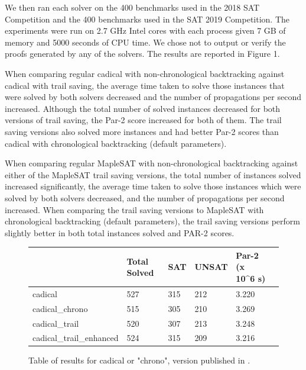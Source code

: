 \documentclass{article}
\begin{document}
We then ran each solver on the 400 benchmarks used in the 2018 SAT Competition and the 400 benchmarks used in the SAT 2019 Competition. The experiments were run on 2.7 GHz Intel cores with each process given 7 GB of memory and 5000 seconds of CPU time. We chose not to output or verify the proofs generated by any of the solvers. The results are reported in Figure 1.

When comparing regular cadical with non-chronological backtracking against cadical with trail saving, the average time taken to solve those instances that were solved by both solvers decreased and the number of propagations per second increased. Although the total number of solved instances decreased for both versions of trail saving, the Par-2 score increased for both of them. The trail saving versions also solved more instances and had better Par-2 scores than cadical with chronological backtracking (default parameters).

When comparing regular MapleSAT with non-chronological backtracking against either of the MapleSAT trail saving versions, the total number of instances solved increased significantly, the average time taken to solve those instances which were solved by both solvers decreased, and the number of propagations per second increased. When comparing the trail saving versions to MapleSAT with chronological backtracking (default parameters), the trail saving versions perform slightly better in both total instances solved and PAR-2 scores.

\begin{figure}
\begin{tabular}{|l|l|l|l|l|l|}
\hline
                         & Total Solved & SAT & UNSAT & Par-2 (x 10\textasciicircum{}6 s) \\ \hline
cadical                  & 527          & 315 &  212  & 3.220                             \\ \hline
cadical\_chrono          & 515          & 305 &  210  & 3.269                             \\ \hline
cadical\_trail           & 520          & 307 &  213  & 3.248                             \\ \hline
cadical\_trail\_enhanced & 524          & 315 &  209  & 3.216                             \\ \hline
\end{tabular}
\caption{Table of results for cadical or "chrono", version published in \cite{DBLP:conf/sat/MohleB19}.}
\end{figure}
\end{document}
